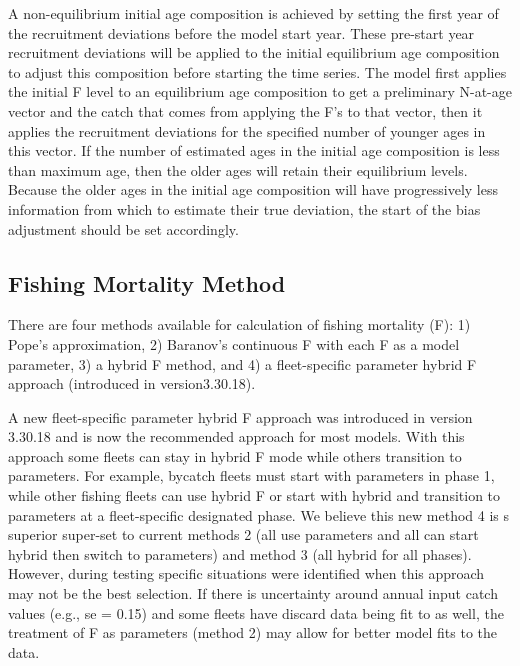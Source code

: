 
A non-equilibrium initial age composition is achieved by setting the first year of the recruitment deviations before the model start year. These pre-start year recruitment deviations will be applied to the initial equilibrium age composition to adjust this composition before starting the time series. The model first applies the initial F level to an equilibrium age composition to get a preliminary N-at-age vector and the catch that comes from applying the F's to that vector, then it applies the recruitment deviations for the specified number of younger ages in this vector. If the number of estimated ages in the initial age composition is less than maximum age, then the older ages will retain their equilibrium levels. Because the older ages in the initial age composition will have progressively less information from which to estimate their true deviation, the start of the bias adjustment should be set accordingly.

\subsection{Fishing Mortality Method}
There are  four methods available for calculation of fishing mortality (F): 1) Pope's approximation, 2) Baranov's continuous F with each F as a model parameter, 3) a hybrid F method, and 4) a fleet-specific parameter hybrid F approach (introduced in version3.30.18).

A new fleet-specific parameter hybrid F approach was introduced in version 3.30.18 and is now the recommended approach for most models. With this approach some fleets can stay in hybrid F mode while others transition to parameters.  For example, bycatch fleets must start with parameters in phase 1, while other fishing fleets can use hybrid F or start with hybrid and transition to parameters at a fleet-specific designated phase. We believe this new method 4 is s superior super-set to current methods 2 (all use parameters and all can start hybrid then switch to parameters) and method 3 (all hybrid for all phases). However, during testing specific situations were identified when this approach may not be the best selection. If there is uncertainty around annual input catch values (e.g., se = 0.15) and some fleets have discard data being fit to as well, the treatment of F as parameters (method 2) may allow for better model fits to the data.


